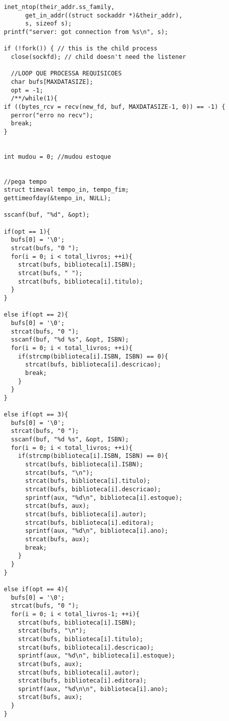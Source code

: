 \documentclass[11pt, brazil]{article} %
\begin{document}
\begin{verbatim}
    inet_ntop(their_addr.ss_family,
	      get_in_addr((struct sockaddr *)&their_addr),
	      s, sizeof s);
    printf("server: got connection from %s\n", s);

    if (!fork()) { // this is the child process
      close(sockfd); // child doesn't need the listener
			
      //LOOP QUE PROCESSA REQUISICOES
      char bufs[MAXDATASIZE];
      opt = -1;	
      /**/while(1){		
	if ((bytes_rcv = recv(new_fd, buf, MAXDATASIZE-1, 0)) == -1) {
	  perror("erro no recv");
	  break;
	}

		    	
	int mudou = 0; //mudou estoque
			
		    	
	//pega tempo
	struct timeval tempo_in, tempo_fim;
	gettimeofday(&tempo_in, NULL);
		    	
	sscanf(buf, "%d", &opt);
		    	
	if(opt == 1){
	  bufs[0] = '\0';
	  strcat(bufs, "0 ");
	  for(i = 0; i < total_livros; ++i){
	    strcat(bufs, biblioteca[i].ISBN);
	    strcat(bufs, " ");
	    strcat(bufs, biblioteca[i].titulo);
	  }
	}
		    	
	else if(opt == 2){
	  bufs[0] = '\0';
	  strcat(bufs, "0 ");
	  sscanf(buf, "%d %s", &opt, ISBN);
	  for(i = 0; i < total_livros; ++i){
	    if(strcmp(biblioteca[i].ISBN, ISBN) == 0){
	      strcat(bufs, biblioteca[i].descricao);
	      break;
	    }		    				
	  }
	}
		    	
	else if(opt == 3){
	  bufs[0] = '\0';
	  strcat(bufs, "0 ");
	  sscanf(buf, "%d %s", &opt, ISBN);
	  for(i = 0; i < total_livros; ++i){
	    if(strcmp(biblioteca[i].ISBN, ISBN) == 0){
	      strcat(bufs, biblioteca[i].ISBN);
	      strcat(bufs, "\n");
	      strcat(bufs, biblioteca[i].titulo);
	      strcat(bufs, biblioteca[i].descricao);
	      sprintf(aux, "%d\n", biblioteca[i].estoque);
	      strcat(bufs, aux);
	      strcat(bufs, biblioteca[i].autor);
	      strcat(bufs, biblioteca[i].editora);
	      sprintf(aux, "%d\n", biblioteca[i].ano);
	      strcat(bufs, aux);
	      break;
	    }		    				
	  }
	}
		    
	else if(opt == 4){
	  bufs[0] = '\0';
	  strcat(bufs, "0 ");
	  for(i = 0; i < total_livros-1; ++i){
	    strcat(bufs, biblioteca[i].ISBN);
	    strcat(bufs, "\n");
	    strcat(bufs, biblioteca[i].titulo);
	    strcat(bufs, biblioteca[i].descricao);
	    sprintf(aux, "%d\n", biblioteca[i].estoque);
	    strcat(bufs, aux);
	    strcat(bufs, biblioteca[i].autor);
	    strcat(bufs, biblioteca[i].editora);
	    sprintf(aux, "%d\n\n", biblioteca[i].ano);
	    strcat(bufs, aux);
	  }
	}
		    	

\end{verbatim}
\end{document}
